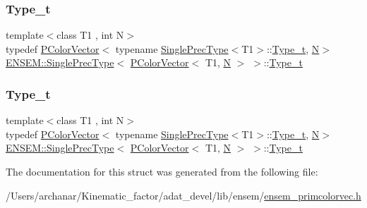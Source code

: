 \subsubsection{\texorpdfstring{Type\_t}{Type\_t}\hspace{0.1cm}{\footnotesize\ttfamily [1/2]}}
{\footnotesize\ttfamily template$<$class T1 , int N$>$ \\
typedef \mbox{\hyperlink{classENSEM_1_1PColorVector}{P\+Color\+Vector}}$<$ typename \mbox{\hyperlink{structENSEM_1_1SinglePrecType}{Single\+Prec\+Type}}$<$T1$>$\+::\mbox{\hyperlink{structENSEM_1_1SinglePrecType_3_01PColorVector_3_01T1_00_01N_01_4_01_4_adbaedd406be0507c332f7676ad81053d}{Type\+\_\+t}}, \mbox{\hyperlink{operator__name__util_8cc_a7722c8ecbb62d99aee7ce68b1752f337}{N}}$>$ \mbox{\hyperlink{structENSEM_1_1SinglePrecType}{E\+N\+S\+E\+M\+::\+Single\+Prec\+Type}}$<$ \mbox{\hyperlink{classENSEM_1_1PColorVector}{P\+Color\+Vector}}$<$ T1, \mbox{\hyperlink{operator__name__util_8cc_a7722c8ecbb62d99aee7ce68b1752f337}{N}} $>$ $>$\+::\mbox{\hyperlink{structENSEM_1_1SinglePrecType_3_01PColorVector_3_01T1_00_01N_01_4_01_4_adbaedd406be0507c332f7676ad81053d}{Type\+\_\+t}}}

\mbox{\label{structENSEM_1_1SinglePrecType_3_01PColorVector_3_01T1_00_01N_01_4_01_4_adbaedd406be0507c332f7676ad81053d}} 
\subsubsection{\texorpdfstring{Type\_t}{Type\_t}\hspace{0.1cm}{\footnotesize\ttfamily [2/2]}}
{\footnotesize\ttfamily template$<$class T1 , int N$>$ \\
typedef \mbox{\hyperlink{classENSEM_1_1PColorVector}{P\+Color\+Vector}}$<$ typename \mbox{\hyperlink{structENSEM_1_1SinglePrecType}{Single\+Prec\+Type}}$<$T1$>$\+::\mbox{\hyperlink{structENSEM_1_1SinglePrecType_3_01PColorVector_3_01T1_00_01N_01_4_01_4_adbaedd406be0507c332f7676ad81053d}{Type\+\_\+t}}, \mbox{\hyperlink{operator__name__util_8cc_a7722c8ecbb62d99aee7ce68b1752f337}{N}}$>$ \mbox{\hyperlink{structENSEM_1_1SinglePrecType}{E\+N\+S\+E\+M\+::\+Single\+Prec\+Type}}$<$ \mbox{\hyperlink{classENSEM_1_1PColorVector}{P\+Color\+Vector}}$<$ T1, \mbox{\hyperlink{operator__name__util_8cc_a7722c8ecbb62d99aee7ce68b1752f337}{N}} $>$ $>$\+::\mbox{\hyperlink{structENSEM_1_1SinglePrecType_3_01PColorVector_3_01T1_00_01N_01_4_01_4_adbaedd406be0507c332f7676ad81053d}{Type\+\_\+t}}}



The documentation for this struct was generated from the following file\+:\begin{DoxyCompactItemize}
\item 
/\+Users/archanar/\+Kinematic\+\_\+factor/adat\+\_\+devel/lib/ensem/\mbox{\hyperlink{lib_2ensem_2ensem__primcolorvec_8h}{ensem\+\_\+primcolorvec.\+h}}\end{DoxyCompactItemize}
